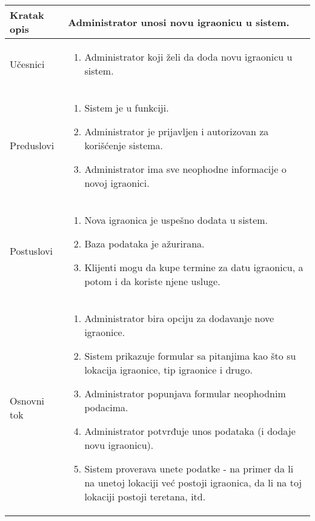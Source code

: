 \documentclass[../main.tex]{subfiles}
\begin{document}
\begin{longtable}{| p{} | p{} |} 

\hline
    Kratak opis &  Administrator unosi novu igraonicu u sistem. \\ 
\hline    
    Učesnici & 
    	\begin{enumerate}
        \item Administrator koji želi da doda novu igraonicu u sistem.
     \end{enumerate}\\
\hline
   Preduslovi & \begin{enumerate}
       \item Sistem je u funkciji.
       \item Administrator je prijavljen i autorizovan za korišćenje sistema.
       \item Administrator ima sve neophodne informacije o novoj igraonici.
   \end{enumerate}\\
\hline  
    Postuslovi & \begin{enumerate}
        \item Nova igraonica je uspešno dodata u sistem.
        \item Baza podataka je ažurirana.
        \item Klijenti mogu da kupe termine za datu igraonicu, a potom i da koriste njene usluge.
    \end{enumerate}\\
\hline
    Osnovni tok & \begin{enumerate}
        \item Administrator bira opciju za dodavanje nove igraonice.
        \item Sistem prikazuje formular sa pitanjima kao što su lokacija igraonice, tip igraonice i drugo.
        \item Administrator popunjava formular neophodnim podacima.
        \item Administrator potvrđuje unos podataka (i dodaje novu igraonicu). %
        \item Sistem proverava unete podatke - na primer da li na unetoj lokaciji već postoji igraonica, da li na toj lokaciji postoji teretana, itd. %

\end{enumerate}
\end{longtable}
\end{document}
